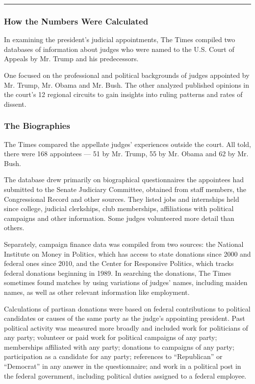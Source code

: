 \begin{center}\rule{0.5\linewidth}{\linethickness}\end{center}

\hypertarget{how-the-numbers-were-calculated}{%
\subsubsection{How the Numbers Were
Calculated}\label{how-the-numbers-were-calculated}}

In examining the president's judicial appointments, The Times compiled
two databases of information about judges who were named to the U.S.
Court of Appeals by Mr. Trump and his predecessors.

One focused on the professional and political backgrounds of judges
appointed by Mr. Trump, Mr. Obama and Mr. Bush. The other analyzed
published opinions in the court's 12 regional circuits to gain insights
into ruling patterns and rates of dissent.

\hypertarget{the-biographies}{%
\subsubsection{The Biographies}\label{the-biographies}}

The Times compared the appellate judges' experiences outside the court.
All told, there were 168 appointees --- 51 by Mr. Trump, 55 by Mr. Obama
and 62 by Mr. Bush.

The database drew primarily on biographical questionnaires the
appointees had submitted to the Senate Judiciary Committee, obtained
from staff members, the Congressional Record and other sources. They
listed jobs and internships held since college, judicial clerkships,
club memberships, affiliations with political campaigns and other
information. Some judges volunteered more detail than others.

Separately, campaign finance data was compiled from two sources: the
National Institute on Money in Politics, which has access to state
donations since 2000 and federal ones since 2010, and the Center for
Responsive Politics, which tracks federal donations beginning in 1989.
In searching the donations, The Times sometimes found matches by using
variations of judges' names, including maiden names, as well as other
relevant information like employment.

Calculations of partisan donations were based on federal contributions
to political candidates or causes of the same party as the judge's
appointing president. Past political activity was measured more broadly
and included work for politicians of any party; volunteer or paid work
for political campaigns of any party; memberships affiliated with any
party; donations to campaigns of any party; participation as a candidate
for any party; references to ``Republican'' or ``Democrat'' in any
answer in the questionnaire; and work in a political post in the federal
government, including political duties assigned to a federal employee.

